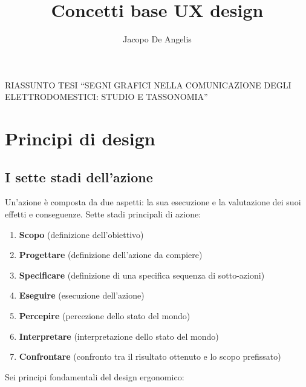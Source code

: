 \documentclass[11pt,a4paper]{article}
\begin{document}
\title{Concetti base UX design}
\author{Jacopo De Angelis}
\maketitle
\tableofcontents
\pagebreak

\begin{center}
	\begin{large}
		RIASSUNTO TESI 
		“SEGNI GRAFICI NELLA COMUNICAZIONE DEGLI ELETTRODOMESTICI: STUDIO E TASSONOMIA”
	\end{large}
\end{center}
\pagebreak

\section{Principi di design}
\subsection{I sette stadi dell'azione}
Un’azione è composta da due aspetti: la sua esecuzione e la valutazione dei suoi effetti e conseguenze.
Sette stadi principali di azione:
\begin{enumerate}
	\item \textbf{Scopo} (definizione dell’obiettivo)
	\item \textbf{Progettare} (definizione dell’azione da compiere)
	\item \textbf{Specificare} (definizione di una specifica sequenza di sotto-azioni)
	\item \textbf{Eseguire} (esecuzione dell’azione)
	\item \textbf{Percepire} (percezione dello stato del mondo)
	\item \textbf{Interpretare} (interpretazione dello stato del mondo)
	\item \textbf{Confrontare} (confronto tra il risultato ottenuto e lo scopo prefissato)
\end{enumerate}
Sei principi fondamentali del design ergonomico:
\end{document}
